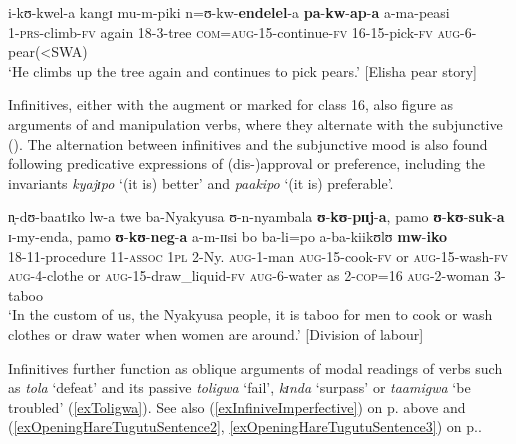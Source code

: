 \begin{exe}
\ex \label{exInfinitive16Aspectualizer}
\gll i-kʊ-kwel-a kangɪ mu-m-piki n=ʊ-kw-\textbf{endelel}-a \textbf{pa}-\textbf{kw}-\textbf{ap}-\textbf{a} a-ma-peasi\\
1-\textsc{prs}-climb-\textsc{fv} again 18-3-tree \textsc{com}=\textsc{aug}-15-continue-\textsc{fv} 16-15-pick-\textsc{fv} \textsc{aug}-6-pear(<SWA)\\
\glt \lq He climbs up the tree again and continues to pick pears.' [Elisha pear story]
\end{exe}

Infinitives, either with the augment or marked for  class 16, also figure as arguments of  and manipulation verbs, where they alternate with the subjunctive (). The alternation between infinitives and the subjunctive mood is also found following predicative expressions of (dis-)approval or preference, including the invariants \textit{kyajɪpo} \lq (it is) better' and \textit{paakipo} \lq (it is) preferable'.

\largerpage[2]
\begin{exe}
\ex \label{exInfinitiveApproval} \gll n̩-dʊ-baatɪko lw-a twe ba-Nyakyusa ʊ-n-nyambala \textbf{ʊ}-\textbf{kʊ}-\textbf{pɪɪj}-\textbf{a}, pamo \textbf{ʊ}-\textbf{kʊ}-\textbf{suk}-\textbf{a} ɪ-my-enda, pamo \textbf{ʊ}-\textbf{kʊ}-\textbf{neg}-\textbf{a} a-m-ɪɪsi bo ba-li=po a-ba-kiikʊlʊ \textbf{mw}-\textbf{iko}\\
18-11-procedure 11-\textsc{assoc} \textsc{1pl} 2-Ny. \textsc{aug}-1-man \textsc{aug}-15-cook-\textsc{fv} or \textsc{aug}-15-wash-\textsc{fv} \textsc{aug}-4-clothe or \textsc{aug}-15-draw\_liquid-\textsc{fv} \textsc{aug}-6-water as 2-\textsc{cop}=16 \textsc{aug}-2-woman 3-taboo\\
\glt \lq  In the custom of us, the Nyakyusa people, it is taboo for men to cook or wash clothes or draw water when women are around.' [Division of labour]
\end{exe}

Infinitives further function as oblique arguments of modal readings of verbs such as \textit{tola} \lq  defeat' and its passive \textit{toligwa} \lq fail', \textit{kɪnda} \lq surpass' or \textit{taamigwa} \lq be troubled' (\ref{exToligwa}). See also (\ref{exInfiniveImperfective}) on p.\nobreakspace\pageref{exInfiniveImperfective} above and (\ref{exOpeningHareTugutuSentence2}, \ref{exOpeningHareTugutuSentence3}) on p.\nobreakspace\pageref{exOpeningHareTugutuSentence2}.

